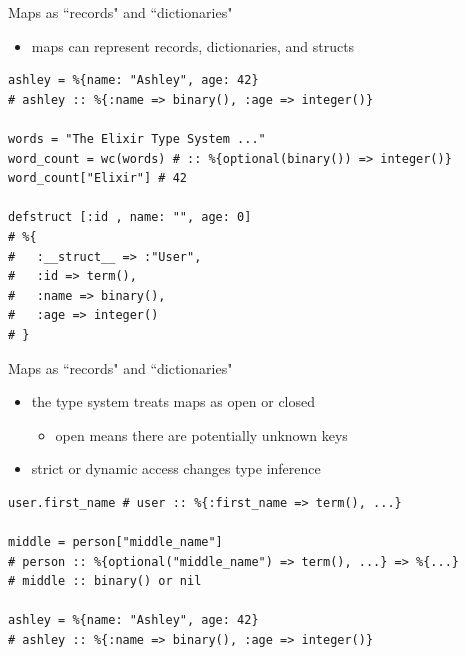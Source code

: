 \documentclass[
  ignorenonframetext,
  aspectratio=169]{beamer}
\providecommand{\tightlist}{%
  \setlength{\itemsep}{0pt}\setlength{\parskip}{0pt}}
\begin{document}
\begin{frame}[fragile]{Maps as ``records" and ``dictionaries"}
\label{maps-as-records-and-dictionaries}
\begin{itemize}
\tightlist
\item
  maps can represent records, dictionaries, and structs
\end{itemize}

\begin{lstlisting}
ashley = %{name: "Ashley", age: 42}
# ashley :: %{:name => binary(), :age => integer()}

words = "The Elixir Type System ..."
word_count = wc(words) # :: %{optional(binary()) => integer()}
word_count["Elixir"] # 42

defstruct [:id , name: "", age: 0]
# %{
#   :__struct__ => :"User",
#   :id => term(),
#   :name => binary(),
#   :age => integer()
# }
\end{lstlisting}
\end{frame}

\begin{frame}[fragile]{Maps as ``records" and ``dictionaries"}
\label{maps-as-records-and-dictionaries-1}
\begin{itemize}
\tightlist
\item
  the type system treats maps as open or closed

  \begin{itemize}
  \tightlist
  \item
    open means there are potentially unknown keys
  \end{itemize}
\item
  strict or dynamic access changes type inference
\end{itemize}

\begin{lstlisting}
user.first_name # user :: %{:first_name => term(), ...}

middle = person["middle_name"]
# person :: %{optional("middle_name") => term(), ...} => %{...}
# middle :: binary() or nil

ashley = %{name: "Ashley", age: 42}
# ashley :: %{:name => binary(), :age => integer()}
\end{lstlisting}
\end{frame}
\end{document}
